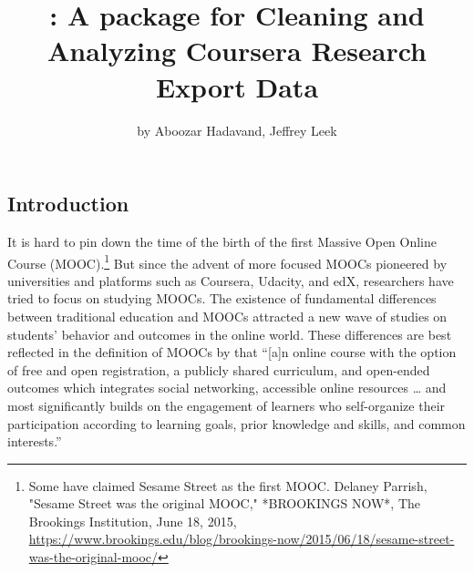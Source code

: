 \title{: A package for Cleaning and Analyzing Coursera Research
Export Data}
\author{by Aboozar Hadavand, Jeffrey Leek}

\maketitle


\subsection{Introduction}\label{introduction}

It is hard to pin down the time of the birth of the first Massive Open
Online Course
(MOOC).\footnote{Some have claimed Sesame Street as the first MOOC. Delaney Parrish, "Sesame Street was the original MOOC," *BROOKINGS NOW*, The Brookings Institution, June 18, 2015, \url{https://www.brookings.edu/blog/brookings-now/2015/06/18/sesame-street-was-the-original-mooc/}}
But since the advent of more focused MOOCs pioneered by universities and
platforms such as Coursera, Udacity, and edX, researchers have tried to
focus on studying MOOCs. The existence of fundamental differences
between traditional education and MOOCs attracted a new wave of studies
on students' behavior and outcomes in the online world. These
differences are best reflected in the definition of MOOCs by
\cite{mcauley2010mooc} that ``{[}a{]}n online course with the option of
free and open registration, a publicly shared curriculum, and open-ended
outcomes which integrates social networking, accessible online resources
\ldots{} and most significantly builds on the engagement of learners who
self-organize their participation according to learning goals, prior
knowledge and skills, and common interests.''


